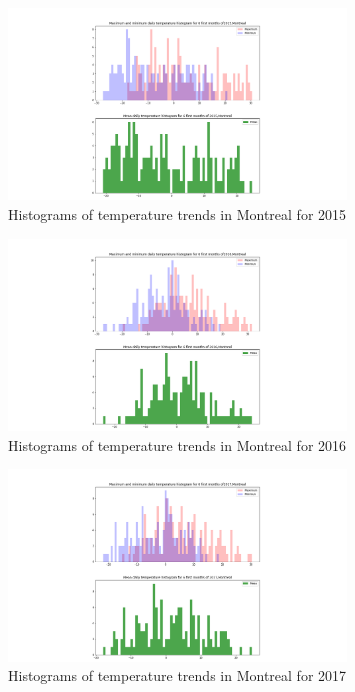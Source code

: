 \documentclass[12pt]{article}
\begin{document}
\begin{figure}[!htbp]
\centering
\includegraphics[width=0.8\textwidth]{./docs/histogram2015.png} 
\caption{\scriptsize Histograms of temperature trends in Montreal for 2015}
\label{hist2015}		  
\end{figure}

\begin{figure}[!htbp]
\centering
\includegraphics[width=0.8\textwidth]{./docs/histogram2016.png} 
\caption{\scriptsize Histograms of temperature trends in Montreal for 2016}
\label{hist2016}		  
\end{figure}

\begin{figure}[!htbp]
\centering
\includegraphics[width=0.8\textwidth]{./docs/histogram2017.png} 
\caption{\scriptsize Histograms of temperature trends in Montreal for 2017}
\label{hist2017}		  
\end{figure}
\end{document}
